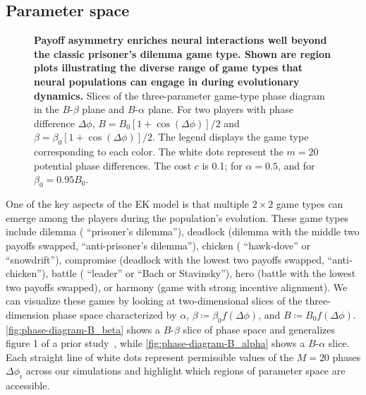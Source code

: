\documentclass[pdflatex,lineno,referee,sn-nature]{sn-jnl}
\begin{document}
\subsection{Parameter space}
\begin{figure*}
  \centering
  \begin{subcaptiongroup}
      {\label{fig:phase-diagram-B_alpha}\captiontext*{}}{%
      {\label{fig:phase-diagram-B_beta}\captiontext*{}}{%
    {}%
  }}
  \end{subcaptiongroup}
  \caption{
    \textbf{
      Payoff asymmetry enriches neural interactions
      well beyond the classic prisoner's dilemma game type.
      Shown are region plots illustrating the diverse range
      of game types that neural populations can engage in
      during evolutionary dynamics.
    }
    Slices of the three-parameter game-type phase diagram
    in the
    $B$-$\beta$ plane
    and
    $B$-$\alpha$ plane.
    For two players with phase difference $\Delta \phi$,
    $B = B_0 [1 + \cos(\Delta \phi)]/2$
    and
    $\beta = \beta_0 [1 + \cos(\Delta \phi)]/2$.
    The legend displays the game type corresponding to each color.
    The white dots represent the $m=20$ potential phase differences.
    The cost $c$ is \num{0.1};
    for
    $\alpha = 0.5$,
    and for
    $\beta_0 = \num{0.95} B_0$.
  }\label{fig:phase-diagram}
\end{figure*}

One of the key aspects of the EK model
is that multiple $2 \times 2$ game types can emerge
among the players during the population's evolution.
These game types~\citep{bruns2015names} include
dilemma (\aka{} ``prisoner's dilemma''),
deadlock (dilemma with the middle two payoffs swapped,
\aka{} ``anti-prisoner's dilemma''),
chicken (\aka{} ``hawk-dove'' or ``snowdrift''),
compromise (deadlock with the lowest two payoffs swapped,
\aka{} ``anti-chicken''),
battle (\aka{} ``leader'' or ``Bach or Stavinsky''),
hero (battle with the lowest two payoffs swapped),
or
harmony (game with strong incentive alignment).
We can visualize these games by looking at two-dimensional slices
of the three-dimension phase space
characterized by $\alpha$, $\beta \coloneqq \beta_0 f(\Delta \phi)$,
and $B \coloneqq B_0 f(\Delta \phi)$.
\cref{fig:phase-diagram-B_beta} shows a $B$-$\beta$ slice of phase space
and generalizes figure 1 of a prior study~\citep{tripp2022evolutionary},
while \cref{fig:phase-diagram-B_alpha} shows a $B$-$\alpha$ slice.
Each straight line of white dots represent permissible values of the $M = 20$ phases
$\Delta \phi_i$ across our simulations
and highlight which regions of parameter space are accessible.
\end{document}
